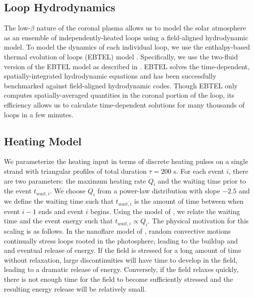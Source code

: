 \subsection{Loop Hydrodynamics}\label{loops}

The low-$\beta$ nature of the coronal plasma allows us to model the solar atmosphere as an ensemble of independently-heated loops using a field-aligned hydrodynamic model. To model the dynamics of each individual loop, we use the enthalpy-based thermal evolution of loops (EBTEL) model \citep{klimchuk_highly_2008,cargill_enthalpy-based_2012}. Specifically, we use the two-fluid version of the EBTEL model as described in \citep{barnes_inference_2016}. EBTEL solves the time-dependent, spatially-integrated hydrodynamic equations and has been successfully benchmarked against field-aligned hydrodynamic codes. Though EBTEL only computes spatially-averaged quantities in the coronal portion of the loop, its efficiency allows us to calculate time-dependent solutions for many thousands of loops in a few minutes.

\subsection{Heating Model}\label{heating}

We parameterize the heating input in terms of discrete heating pulses on a single strand with triangular profiles of total duration $\tau=200$ s. For each event $i$, there are two parameters: the maximum heating rate $Q_i$ and the waiting time prior to the event $t_{wait,i}$. We choose $Q_i$ from a power-law distribution with slope $-2.5$ and we define the waiting time such that $t_{wait,i}$ is the amount of time between when event $i-1$ ends and event $i$ begins. Using the model of \citet{cargill_active_2014}, we relate the waiting time and the event energy such that $t_{wait,i}\propto Q_i$. The physical motivation for this scaling is as follows. In the nanoflare model of \citet{parker_nanoflares_1988}, random convective motions continually stress loops rooted in the photosphere, leading to the buildup and and eventual release of energy. If the field is stressed for a long amount of time without relaxation, large discontinuities will have time to develop in the field, leading to a dramatic release of energy. Conversely, if the field relaxes quickly, there is not enough time for the field to become sufficiently stressed and the resulting energy release will be relatively small. 

